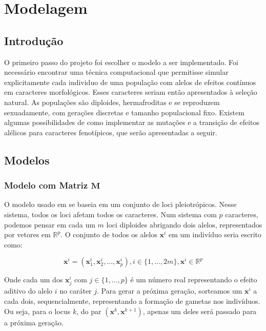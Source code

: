 \pagestyle{empty}
\cleardoublepage
\pagestyle{fancy}
\chapter{Modelagem}\label{cap2}

\section{Introdução}\label{cap2:intro}

O primeiro passo do projeto foi escolher o modelo a ser implementado.
Foi necessário encontrar uma técnica computacional que permitisse
simular explicitamente cada individuo de uma população com alelos de efeitos
contínuos em caracteres morfológicos.
Esses caracteres seriam então apresentados à seleção natural.
As populações são diploides, hermafroditas e se reproduzem sexuadamente,
com gerações discretas e tamanho populacional fixo.
Existem algumas possibilidades de como implementar as mutações e
a transição de efeitos alélicos para caracteres fenotípicos, que serão
apresentadas a seguir.

\section{Modelos}\label{cap2:mem}

\subsection{Modelo com Matriz $\mathbf{M}$}\label{cap2:mem:ModelM}

O modelo usado em \cite{Jones2003, Jones2004, Jones2007} se baseia em um
conjunto de loci pleiotrópicos.
Nesse sistema, todos os loci afetam todos os caracteres.
Num sistema com $p$ caracteres, podemos pensar em cada um $m$ loci
diploides abrigando dois alelos, representados por vetores em
$\mathbb{R}^p$.
O conjunto de todos os alelos $\mathbf{x}^i$ em um indivíduo seria
escrito como:

\begin{equation}
\mathbf{x}^i = ( \mathbf{x}^i_1, \mathbf{x}^i_2,\ldots, \mathbf{x}^i_p), i \in \{1,\ldots, 2m\}, \mathbf{x}^i \in \mathbb{R}^p
\end{equation}

Onde cada um dos $\mathbf{x}^i_j$ com $j \in \{1,\ldots, p\}$ é um número real
representando o efeito aditivo do alelo $i$ no caráter $j$.
Para gerar a próxima geração, sorteamos um $\mathbf{x}^i$ a cada dois,
sequencialmente, representando a formação de gametas nos indivíduos.
Ou seja, para o locus $k$, do par $(\mathbf{x}^{k},\mathbf{x}^{k+1})$,
apenas um deles será passado para a próxima geração.

